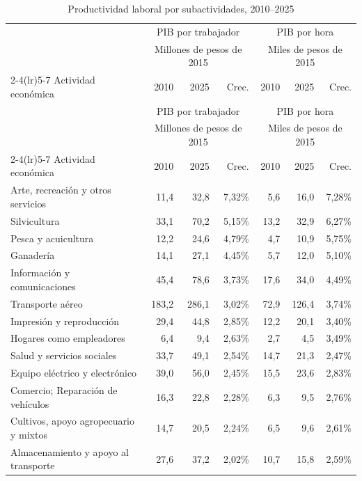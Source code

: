\begingroup
\footnotesize
\begin{longtable}{p{}rrrrrr}
\caption{Productividad laboral por subactividades, 2010--2025}\label{tab:pib_geih_productividad_61}\\
\toprule
& \multicolumn{3}{c}{PIB por trabajador} & \multicolumn{3}{c}{PIB por hora} \\
& \multicolumn{3}{c}{\footnotesize Millones de pesos de 2015} & \multicolumn{3}{c}{\footnotesize Miles de pesos de 2015} \\
\cmidrule(lr){2-4}\cmidrule(lr){5-7}
Actividad económica & 2010 & 2025 & Crec. & 2010 & 2025 & Crec. \\
\midrule
\endfirsthead
\toprule
& \multicolumn{3}{c}{PIB por trabajador} & \multicolumn{3}{c}{PIB por hora} \\
& \multicolumn{3}{c}{\footnotesize Millones de pesos de 2015} & \multicolumn{3}{c}{\footnotesize Miles de pesos de 2015} \\
\cmidrule(lr){2-4}\cmidrule(lr){5-7}
Actividad económica & 2010 & 2025 & Crec. & 2010 & 2025 & Crec. \\
\midrule
\endhead
Arte, recreación y otros servicios & 11,4 & 32,8 & 7,32\% & 5,6 & 16,0 & 7,28\% \\
Silvicultura & 33,1 & 70,2 & 5,15\% & 13,2 & 32,9 & 6,27\% \\
Pesca y acuicultura & 12,2 & 24,6 & 4,79\% & 4,7 & 10,9 & 5,75\% \\
Ganadería & 14,1 & 27,1 & 4,45\% & 5,7 & 12,0 & 5,10\% \\
Información y comunicaciones & 45,4 & 78,6 & 3,73\% & 17,6 & 34,0 & 4,49\% \\
Transporte aéreo & 183,2 & 286,1 & 3,02\% & 72,9 & 126,4 & 3,74\% \\
Impresión y reproducción & 29,4 & 44,8 & 2,85\% & 12,2 & 20,1 & 3,40\% \\
Hogares como empleadores & 6,4 & 9,4 & 2,63\% & 2,7 & 4,5 & 3,49\% \\
Salud y servicios sociales & 33,7 & 49,1 & 2,54\% & 14,7 & 21,3 & 2,47\% \\
Equipo eléctrico y electrónico & 39,0 & 56,0 & 2,45\% & 15,5 & 23,6 & 2,83\% \\
Comercio; Reparación de vehículos & 16,3 & 22,8 & 2,28\% & 6,3 & 9,5 & 2,76\% \\
Cultivos, apoyo agropecuario y mixtos & 14,7 & 20,5 & 2,24\% & 6,5 & 9,6 & 2,61\% \\
Almacenamiento y apoyo al transporte & 27,6 & 37,2 & 2,02\% & 10,7 & 15,8 & 2,59\% \\

\end{longtable}

